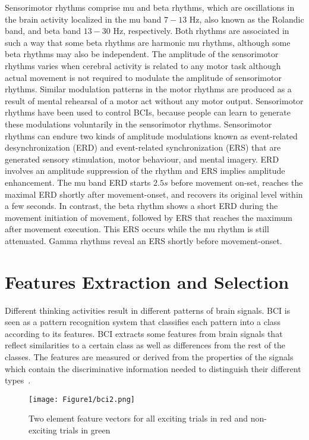 Sensorimotor rhythms comprise mu and beta rhythms, which are oscillations in the brain activity localized in the mu band $7-13$ Hz, also known as the Rolandic band, and beta band $13-30$ Hz, respectively. Both rhythms are associated in such a way that some beta rhythms are harmonic mu rhythms, although some beta rhythms may also be independent. The amplitude of the sensorimotor rhythms varies when cerebral activity is related to any motor task although actual movement is not required to modulate the amplitude of sensorimotor rhythms. Similar modulation patterns in the motor rhythms are produced as a result of mental rehearsal of a motor act without any motor output. Sensorimotor rhythms have been used to control BCIs, because people can learn to generate these modulations voluntarily in the sensorimotor rhythms. Sensorimotor rhythms can endure two kinds of amplitude modulations known as event-related desynchronization (ERD) and event-related synchronization (ERS) that are generated sensory stimulation, motor behaviour, and mental imagery. ERD involves an amplitude suppression of the rhythm and ERS implies amplitude enhancement. The mu band ERD starts $2.5s$ before movement on-set, reaches the maximal ERD shortly after movement-onset, and recovers its original level within a few seconds. In contrast, the beta rhythm shows a short ERD during the movement initiation of movement, followed by ERS that reaches the maximum after movement execution. This ERS occurs while the mu rhythm is still attenuated. Gamma rhythms reveal an ERS shortly before movement-onset.
 
\section{Features Extraction and Selection}\label{ch2:5}
Different thinking activities result in different patterns of brain signals. BCI is seen as a pattern recognition system that classifies each pattern into a class according to its features. BCI extracts some features from brain signals that reflect similarities to a certain class as well as differences from the rest of the classes. The features are measured or derived from the properties of the signals which contain the discriminative information needed to distinguish their different types~\cite{8}.

\begin{figure}
\centering
\texttt{[image: Figure1/bci2.png]}
\caption{Two element feature vectors for all exciting trials in red and non-exciting trials in green}
\label{twoele}
\end{figure}

